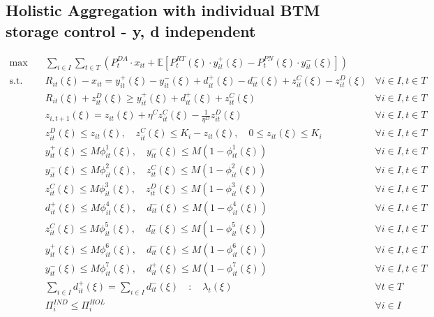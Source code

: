 \documentclass[10pt]{article}
\begin{document}
\subsection{Holistic Aggregation with individual BTM storage control - y, d independent}
\begin{subequations}
   \begin{align}
       \text{max} \quad & \sum_{i\in I}\sum_{t\in T}\left(P_t^{DA} \cdot x_{it} + \mathbb{E}\left[P_t^{RT}(\xi) \cdot y^+_{it}(\xi) - P_t^{PN}(\xi) \cdot y^-_{it}(\xi)\right]\right) \label{eq:5a}\\   
       \text{s.t.} \quad 
       & R_{it}(\xi) - x_{it} = y_{it}^{+}(\xi) - y_{it}^{-}(\xi) + d^+_{it}(\xi) - d^-_{it}(\xi) + z^C_{it}(\xi) - z^D_{it}(\xi) & \forall i \in I, t \in T \label{eq:5b}\\
       & R_{it}(\xi) + z^D_{it}(\xi) \geq y^+_{it}(\xi) + d^+_{it}(\xi) + z^C_{it}(\xi) & \forall i \in I, t \in T \label{eq:5c}\\
       & z_{i,t+1}(\xi) = z_{it}(\xi) + \eta^C z^C_{it}(\xi) - \frac{1}{\eta^D}z^D_{it}(\xi) & \forall i \in I, t \in T \label{eq:5d}\\
       & z^D_{it}(\xi) \le z_{it}(\xi), \quad z^C_{it}(\xi) \le K_i - z_{it}(\xi), \quad 0 \leq z_{it}(\xi) \leq K_i & \forall i \in I, t \in T \label{eq:5e}\\
       & y^+_{it}(\xi) \leq M \phi^1_{it}(\xi), \quad y^-_{it}(\xi) \leq M (1 - \phi^1_{it}(\xi)) & \forall i \in I, t \in T \label{eq:5f}\\
       & y^-_{it}(\xi) \leq M \phi^2_{it}(\xi), \quad z^C_{it}(\xi) \leq M (1 - \phi^2_{it}(\xi)) & \forall i \in I, t \in T \label{eq:5g}\\
       & z^C_{it}(\xi) \leq M \phi^3_{it}(\xi), \quad z^D_{it}(\xi) \leq M (1 - \phi^3_{it}(\xi)) & \forall i \in I, t \in T \label{eq:5h}\\
       & d^+_{it}(\xi) \leq M \phi^4_{it}(\xi), \quad d^-_{it}(\xi) \leq M (1 - \phi^4_{it}(\xi)) & \forall i \in I, t \in T \label{eq:5i}\\
       & z^C_{it}(\xi) \leq M \phi^5_{it}(\xi), \quad d^-_{it}(\xi) \leq M (1 - \phi^5_{it}(\xi)) & \forall i \in I, t \in T \label{eq:5j}\\
       & y^+_{it}(\xi) \leq M \phi^6_{it}(\xi), \quad d^-_{it}(\xi) \leq M (1 - \phi^6_{it}(\xi)) & \forall i \in I, t \in T \label{eq:5k}\\
       & y^-_{it}(\xi) \leq M \phi^7_{it}(\xi), \quad d^+_{it}(\xi) \leq M (1 - \phi^7_{it}(\xi)) & \forall i \in I, t \in T \label{eq:5l}\\
       & \sum_{i \in I} d^+_{it}(\xi) = \sum_{i \in I} d^-_{it}(\xi) \quad : \quad \lambda_t(\xi) & \forall t \in T \label{eq:5m} \\
       & \Pi^{IND}_i \leq \Pi^{HOL}_i & \forall i \in I
   \end{align}
\end{subequations}
\end{document}
